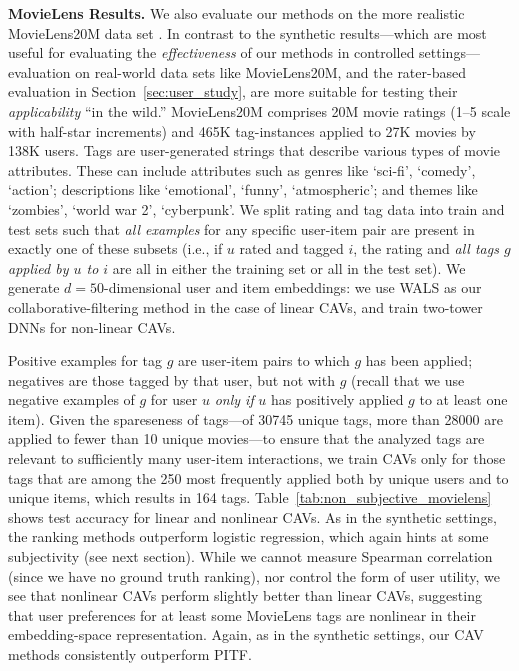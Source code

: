 \documentclass[manuscript,screen,nonacm]{acmart}
\newcommand{\1}{{\mathbf 1}}
\theoremstyle{TheoremNum}
\begin{document}
\vskip 2mm
\noindent
\textbf{MovieLens Results.} \hspace*{2mm}
We also evaluate our methods on the more realistic MovieLens20M data set \cite{harper16:movielens}. In contrast to the synthetic results---which are most useful for evaluating the \emph{effectiveness} of our methods in controlled settings---evaluation on real-world data sets like MovieLens20M, and the rater-based evaluation in Section~\ref{sec:user_study}, are more suitable for testing their \emph{applicability} ``in the wild.''
MovieLens20M comprises 
20M movie ratings (1--5 scale with half-star increments) and 465K tag-instances  applied to 27K movies by 138K users.
Tags are user-generated strings that describe various types of movie attributes. These can include attributes such as genres like `sci-fi', `comedy', `action';  descriptions like `emotional', `funny', `atmospheric'; and themes like `zombies', `world war 2', `cyberpunk'.
We split rating and tag data into train and test sets such that \emph{all examples} for any specific user-item pair are present in exactly one of these subsets (i.e., if $u$ rated and tagged $i$, the rating and \emph{all tags $g$ applied by $u$ to $i$} are all in either the training set or all in the test set). We generate $d=50$-dimensional user and item embeddings: we use 
WALS as our collaborative-filtering method in the case of linear CAVs, and train two-tower DNNs for non-linear CAVs.

Positive examples for
tag $g$ are user-item pairs to which $g$ has been applied; negatives are those tagged by that user, but not with $g$ (recall that we use negative examples of $g$ for user $u$ \emph{only if} $u$ has positively applied $g$ to at least one item). 
% 
Given the spareseness of tags---of 30745 unique tags, more than 28000 are applied to fewer than 10 unique movies---to ensure that the analyzed tags are relevant to sufficiently many user-item interactions, 
we train CAVs only for those tags that are among the 250 most frequently applied both by unique users and to unique items, which results in 164 tags.
Table~\ref{tab:non_subjective_movielens} shows test accuracy for linear and nonlinear CAVs. As in the synthetic settings, the ranking methods outperform logistic regression, which again hints at some subjectivity (see next section).
While we cannot measure Spearman correlation (since we have no ground truth ranking), nor control the form of user utility, we see that nonlinear CAVs perform slightly better than linear CAVs, suggesting that user preferences for at least some MovieLens tags are nonlinear in their embedding-space representation.
Again, as in the synthetic settings, our CAV methods consistently outperform PITF.
\end{document}

